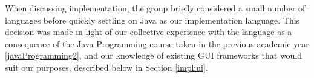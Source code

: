 When discussing implementation, the group briefly considered a small
number of languages before quickly settling on Java as our 
implementation language. This decision was made in light of our 
collective experience with the language as a consequence of the Java 
Programming course taken in the previous academic year
\ref{javaProgramming2}, and our knowledge of existing GUI frameworks 
that would suit our purposes, described below in Section \ref{impl:ui}.


